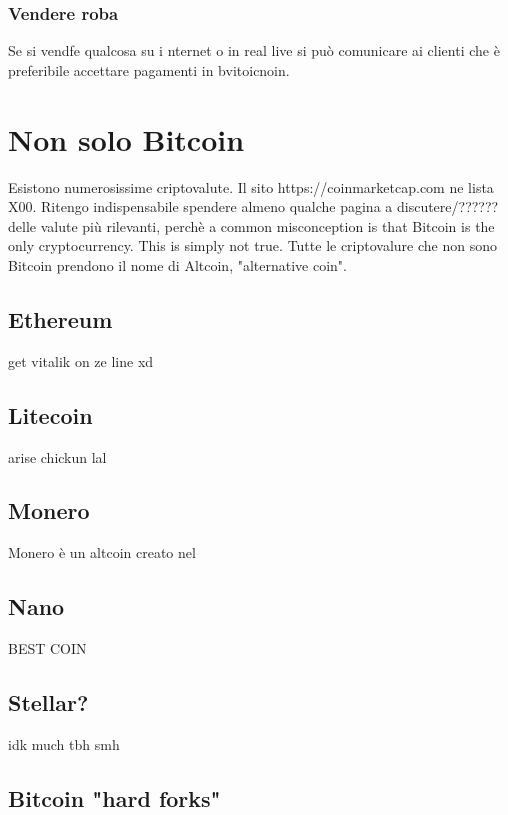 \documentclass {article}
\begin{document}
\subsubsection {Vendere roba}

Se si vendfe qualcosa su i nternet o in real live si può comunicare ai clienti che è preferibile accettare pagamenti in bvitoicnoin.

\section {Non solo Bitcoin}

Esistono numerosissime criptovalute. Il sito https://coinmarketcap.com ne lista X00. Ritengo indispensabile spendere almeno qualche pagina a discutere/?????? delle valute più rilevanti, perchè a common misconception is that Bitcoin is the only cryptocurrency. This is simply not true. Tutte le criptovalure che non sono Bitcoin prendono il nome di Altcoin, "alternative coin".

\subsection {Ethereum}

get vitalik on ze line xd

\subsection {Litecoin}

arise chickun lal

\subsection {Monero}

Monero è un altcoin creato nel

\subsection {Nano}

BEST COIN

\subsection {Stellar?}

idk much tbh smh

\subsection {Bitcoin "hard forks"}
\end{document}
